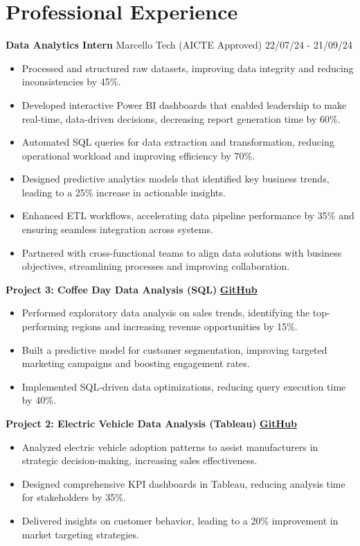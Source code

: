 \documentclass[a4paper,10pt]{article}
\begin{document}
\section*{Professional Experience}
\textbf{Data Analytics Intern} \hfill Marcello Tech (AICTE Approved) \hfill 22/07/24 - 21/09/24
\begin{itemize}
    \item Processed and structured raw datasets, improving data integrity and reducing inconsistencies by 45\%.
    \item Developed interactive Power BI dashboards that enabled leadership to make real-time, data-driven decisions, decreasing report generation time by 60\%.
    \item Automated SQL queries for data extraction and transformation, reducing operational workload and improving efficiency by 70\%.
    \item Designed predictive analytics models that identified key business trends, leading to a 25\% increase in actionable insights.
    \item Enhanced ETL workflows, accelerating data pipeline performance by 35\% and ensuring seamless integration across systems.
    \item Partnered with cross-functional teams to align data solutions with business objectives, streamlining processes and improving collaboration.
\end{itemize}

\textbf{Project 3: Coffee Day Data Analysis (SQL)} \hfill \textbf{\textcolor{graycolor}{\href{https://github.com/Mubarak-04/Coffee-Day-project}{GitHub}}}
\begin{itemize}
    \item Performed exploratory data analysis on sales trends, identifying the top-performing regions and increasing revenue opportunities by 15\%.
    \item Built a predictive model for customer segmentation, improving targeted marketing campaigns and boosting engagement rates.
    \item Implemented SQL-driven data optimizations, reducing query execution time by 40\%.
\end{itemize}

\textbf{Project 2: Electric Vehicle Data Analysis (Tableau)} \hfill \textbf{\textcolor{graycolor}{\href{https://github.com/Mubarak-04/Electric-Vehicle-Data-Analysis}{GitHub}}}
\begin{itemize}
    \item Analyzed electric vehicle adoption patterns to assist manufacturers in strategic decision-making, increasing sales effectiveness.
    \item Designed comprehensive KPI dashboards in Tableau, reducing analysis time for stakeholders by 35\%.
    \item Delivered insights on customer behavior, leading to a 20\% improvement in market targeting strategies.
\end{itemize}
\end{document}
